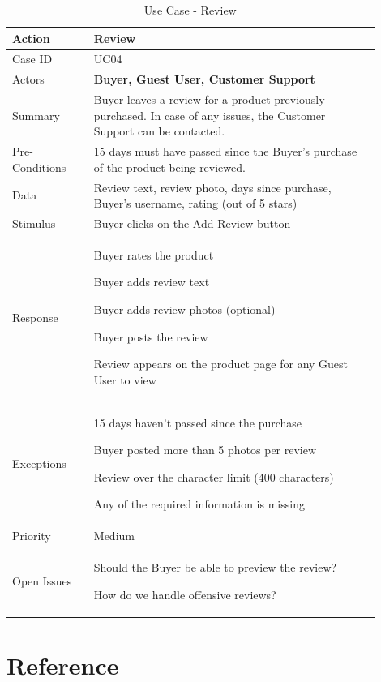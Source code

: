 \documentclass[11pt]{article}
\newcounter{use case ID}
\newcommand\tabularhead[1]{
    \begin{table}[ht]
        \addtocounter{use case ID}{1}
        \caption{Use Case \arabic{use case ID} - #1}
        \vspace{0.2cm}
        \begin{tabular}{|p{0.2\linewidth}|p{0.70\linewidth}|}
            \hline
            \textbf{Action} & \textbf{#1} \\
            \hline}
\newcommand\addrow[2]{#1 & #2\\ \hline}
\newcommand\addmulrow[2]{ \begin{minipage}[t][][t]{2.5cm}#1\end{minipage}
                &\begin{minipage}[t][][t]{11cm}
                    \begin{enumerate}[itemsep=-1ex] #2   \end{enumerate}
                \end{minipage}\vfill\\ \hline}
\newenvironment{usecase}{\tabularhead}
        {\hline\end{tabular}\end{table}}
\newcounter{req ID}
\begin{document}
\begin{usecase}{Review}
    \addrow{Case ID}{UC04}
    \addrow{Actors}{\textbf{Buyer, Guest User, Customer Support}}
    \addrow{Summary}{Buyer leaves a review for a product previously purchased. In case of any issues, the Customer Support can be contacted.}
    \addrow{Pre-Conditions}{
        15 days must have passed since the Buyer’s purchase of the product being reviewed.
        }
    \addrow{Data}{
Review text, review photo, days since purchase, Buyer’s username, rating (out of 5 stars)
}
    \addrow{Stimulus}{Buyer clicks on the Add Review button}
    \addmulrow{Response}{
        \begin{itemize}{
            \item Buyer rates the product
            \item Buyer adds review text
            \item Buyer adds review photos (optional)
            \item Buyer posts the review
            \item Review appears on the product page for any Guest User to view
        }\end{itemize}}
    \addmulrow{Exceptions}{
        \begin{enumerate}{
        \item 15 days haven’t passed since the purchase
            \item Buyer posted more than 5 photos per review
            \item Review over the character limit (400 characters)
            \item Any of the required information is missing
        } \end{enumerate}}
    \addrow{Priority}{Medium}
    \addmulrow{Open Issues}{
        \begin{enumerate}{
            \item Should the Buyer be able to preview the review?
            \item How do we handle offensive reviews?
            } 
        \end{enumerate}}
\end{usecase}

\clearpage

\section{Reference}
\end{document}
